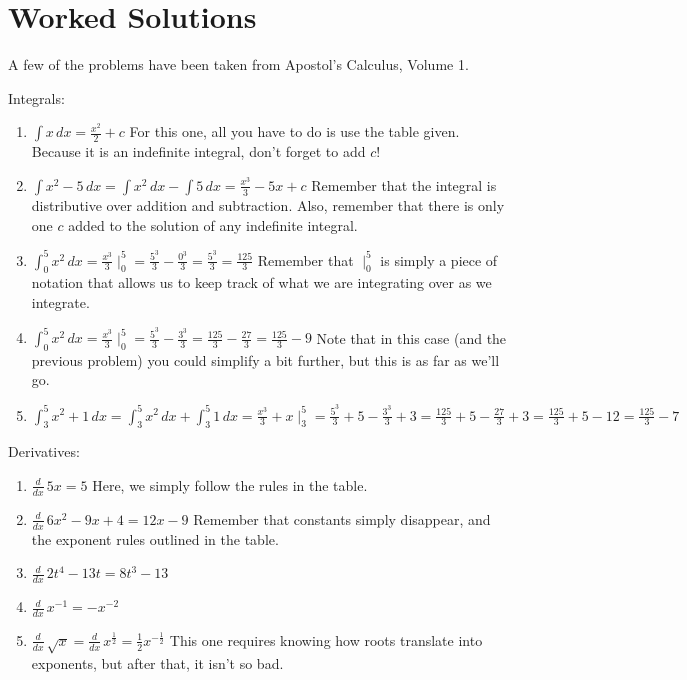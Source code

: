 \documentclass[12pt]{article}
\begin{document}
\section{Worked Solutions}

A few of the problems have been taken from Apostol's Calculus, Volume 1.

Integrals: 
\begin{enumerate}
\item $\int x \, dx = \frac{x^2}{2}+c$ For this one, all you have to do is use the table given. Because it is an indefinite integral, don't forget to add $c$!
\item $\int x^2 - 5 \,dx = \int x^2 \, dx - \int 5 \, dx = \frac{x^3}{3}-5x + c$ Remember that the integral is distributive over addition and subtraction. Also, remember that there is only one $c$ added to the solution of any indefinite integral.
\item $\int^5_0 x^2 \, dx = \frac{x^3}{3}\mid^5_0 = \frac{5^3}{3}-\frac{0^3}{3}=\frac{5^3}{3}=\frac{125}{3}$ Remember that $\mid^5_0$ is simply a piece of notation that allows us to keep track of what we are integrating over as we integrate.
\item $\int^5_0 x^2 \, dx = \frac{x^3}{3}\mid^5_0 = \frac{5^3}{3}-\frac{3^3}{3} = \frac{125}{3} - \frac{27}{3} = \frac{125}{3}-9$ Note that in this case (and the previous problem) you could simplify a bit further, but this is as far as we'll go.
\item $\int^5_3 x^2 + 1\, dx = \int^5_3 x^2 \, dx + \int^5_3 1 \, dx = \frac{x^3}{3}+x\mid^5_3 = \frac{5^3}{3}+5 - \frac{3^3}{3}+3 = \frac{125}{3}+5 - \frac{27}{3}+3 = \frac{125}{3}+5 - 12 = \frac{125}{3}-7$
\end{enumerate}

Derivatives:
\begin{enumerate}
\item $\frac{d}{dx} \, 5x = 5$ Here, we simply follow the rules in the table.
\item $\frac{d}{dx} \, 6x^2 - 9x + 4 = 12x - 9$ Remember that constants simply disappear, and the exponent rules outlined in the table.
\item $\frac{d}{dx} \, 2t^4 - 13t = 8t^3 - 13$
\item $\frac{d}{dx}\, x^{-1} = -x^{-2}$ 
\item $\frac{d}{dx}\, \sqrt{x} = \frac{d}{dx}\, x^{\frac{1}{2}} = \frac{1}{2}x^{-\frac{1}{2}}$ This one requires knowing how roots translate into exponents, but after that, it isn't so bad.
\end{enumerate}
\end{document}
